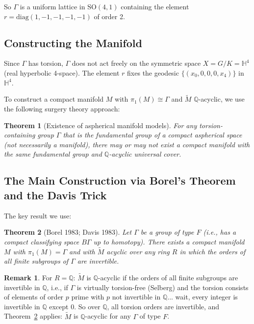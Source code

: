 \documentclass[12pt]{article}
\newtheorem{theorem}{Theorem}
\theoremstyle{definition}
\newtheorem{remark}{Remark}
\begin{document}
So $\Gamma$ is a uniform lattice in $\mathrm{SO}(4,1)$ containing the element $r = \mathrm{diag}(1,-1,-1,-1,-1)$ of order 2.

\subsection{Constructing the Manifold}

Since $\Gamma$ has torsion, $\Gamma$ does not act freely on the symmetric space $X = G/K = \mathbb{H}^4$ (real hyperbolic 4-space). The element $r$ fixes the geodesic $\{(x_0,0,0,0,x_4)\}$ in $\mathbb{H}^4$.

To construct a compact manifold $M$ with $\pi_1(M)\cong\Gamma$ and $\tilde{M}$ $\mathbb{Q}$-acyclic, we use the following surgery theory approach:

\begin{theorem}[Existence of aspherical manifold models]\label{thm:aspherical}
For any torsion-containing group $\Gamma$ that is the fundamental group of a compact aspherical space (not necessarily a manifold), there may or may not exist a compact manifold with the same fundamental group and $\mathbb{Q}$-acyclic universal cover.
\end{theorem}

\subsection{The Main Construction via Borel's Theorem and the Davis Trick}

The key result we use:

\begin{theorem}[Borel 1983; Davis 1983]\label{thm:davis}
Let $\Gamma$ be a group of type $F$ (i.e., has a compact classifying space $B\Gamma$ up to homotopy). There exists a compact manifold $M$ with $\pi_1(M) = \Gamma$ and with $\tilde{M}$ acyclic over any ring $R$ in which the orders of all finite subgroups of $\Gamma$ are invertible.
\end{theorem}

\begin{remark}
For $R = \mathbb{Q}$: $\tilde{M}$ is $\mathbb{Q}$-acyclic if the orders of all finite subgroups are invertible in $\mathbb{Q}$, i.e., if $\Gamma$ is virtually torsion-free (Selberg) and the torsion consists of elements of order $p$ prime with $p$ not invertible in $\mathbb{Q}$... wait, every integer is invertible in $\mathbb{Q}$ except $0$. So over $\mathbb{Q}$, all torsion orders are invertible, and Theorem~\ref{thm:davis} applies: $\tilde{M}$ is $\mathbb{Q}$-acyclic for any $\Gamma$ of type $F$.
\end{remark}
\end{document}
